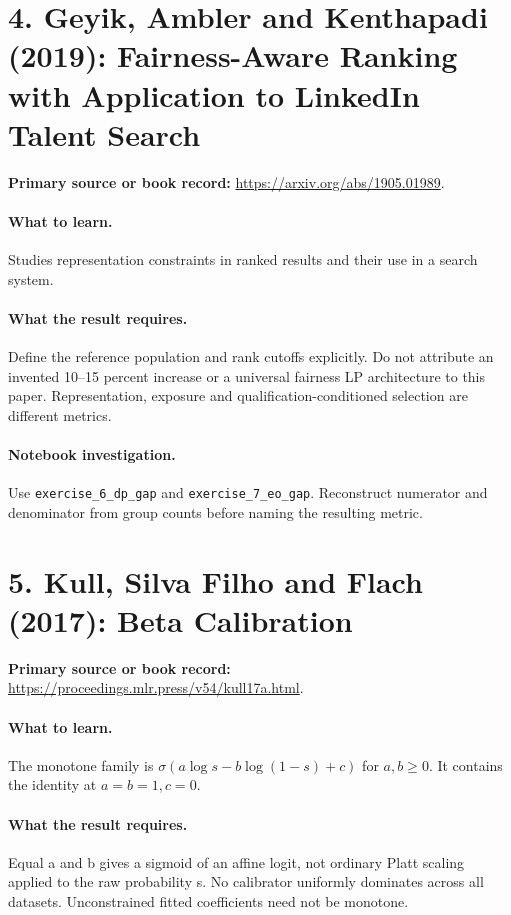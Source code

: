 \documentclass[11pt]{scrartcl}
\begin{document}
\section*{4. Geyik, Ambler and Kenthapadi (2019): Fairness-Aware Ranking with Application to LinkedIn Talent Search}
\textbf{Primary source or book record:} \url{https://arxiv.org/abs/1905.01989}.

\paragraph{What to learn.} Studies representation constraints in ranked results and their use in a search system.

\paragraph{What the result requires.} Define the reference population and rank cutoffs explicitly. Do not attribute an invented 10--15 percent increase or a universal fairness LP architecture to this paper. Representation, exposure and qualification-conditioned selection are different metrics.

\paragraph{Notebook investigation.} Use \texttt{exercise\_6\_dp\_gap} and \texttt{exercise\_7\_eo\_gap}. Reconstruct numerator and denominator from group counts before naming the resulting metric.

\section*{5. Kull, Silva Filho and Flach (2017): Beta Calibration}
\textbf{Primary source or book record:} \url{https://proceedings.mlr.press/v54/kull17a.html}.

\paragraph{What to learn.} The monotone family is $\sigma(a\log s-b\log(1-s)+c)$ for $a,b\ge0$. It contains the identity at $a=b=1,c=0$.

\paragraph{What the result requires.} Equal a and b gives a sigmoid of an affine logit, not ordinary Platt scaling applied to the raw probability s. No calibrator uniformly dominates across all datasets. Unconstrained fitted coefficients need not be monotone.
\end{document}

